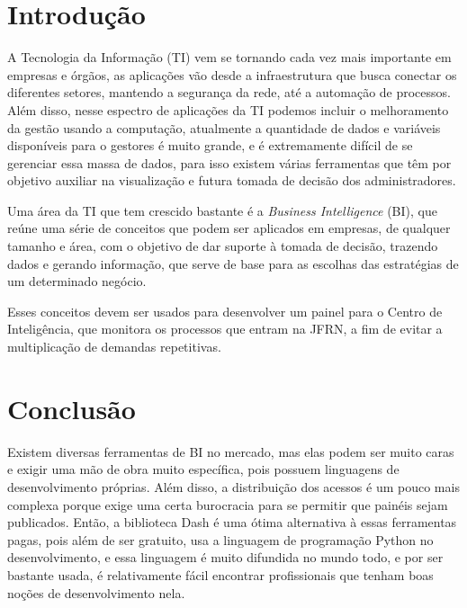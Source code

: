 \chapter*{Introdução}

A Tecnologia da Informação (TI) vem se tornando cada vez mais importante em empresas e órgãos, as aplicações vão desde a infraestrutura que busca conectar os diferentes setores, mantendo a segurança da rede, até a automação de processos. Além disso, nesse espectro de aplicações da TI podemos incluir o melhoramento da gestão usando a computação, atualmente a quantidade de dados e variáveis disponíveis para o gestores é muito grande, e é extremamente difícil de se gerenciar essa massa de dados, para isso existem várias ferramentas que têm por objetivo auxiliar na visualização e futura tomada de decisão dos administradores.

Uma área da TI que tem crescido bastante é a \textit{Business Intelligence} (BI), que reúne uma série de conceitos que podem ser aplicados em empresas, de qualquer tamanho e área, com o objetivo de dar suporte à tomada de decisão, trazendo dados e gerando informação, que serve de base para as escolhas das estratégias de um determinado negócio.

Esses conceitos devem ser usados para desenvolver um painel para o Centro de Inteligência, que monitora os processos que entram na JFRN, a fim de evitar a multiplicação de demandas repetitivas.



%






\chapter{Conclusão}

Existem diversas ferramentas de BI no mercado, mas elas podem ser muito caras e exigir uma mão de obra muito específica, pois possuem linguagens de desenvolvimento próprias. Além disso, a distribuição dos acessos é um pouco mais complexa porque exige uma certa burocracia para se permitir que painéis sejam publicados. Então, a biblioteca Dash é uma ótima alternativa à essas ferramentas pagas, pois além de ser gratuito, usa a linguagem de programação Python no desenvolvimento, e essa linguagem é muito difundida no mundo todo, e por ser bastante usada, é relativamente fácil encontrar profissionais que tenham boas noções de desenvolvimento nela. 

